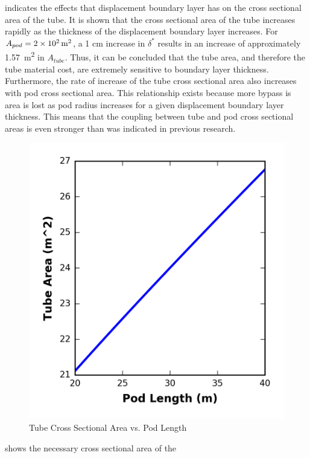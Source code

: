  indicates the effects that
displacement boundary layer has on the cross sectional area of the tube.
It is shown that the cross sectional area of the tube increases rapidly as the
thickness of the displacement boundary layer increases.
For $A_{pod} = \SI{2d2}{\metre\squared}$, a 1 cm increase in $\delta^{*}$
results in an increase of approximately \SI{1.57}{\metre\squared} in $A_{tube}$.
Thus, it can be concluded that the tube area, and therefore the tube material cost,
are extremely sensitive to boundary layer thickness. Furthermore, the rate of
increase of the tube cross sectional area also increases with pod cross sectional area.
This relationship exists because more bypass is area is lost as pod radius
increases for a given displacement boundary layer thickness. This means that
the coupling between tube and pod cross sectional areas is even stronger than
was indicated in previous research.
\begin{figure}
	\centering
	\caption{Tube Cross Sectional Area vs. Pod Length}
	\label{fig:tube_area_vs_length}
	\includegraphics{../../images/graphs/boundary_layer_length_trades/Tube_Area_vs_pod_length.png}
\end{figure}
 shows the necessary cross sectional area of the
